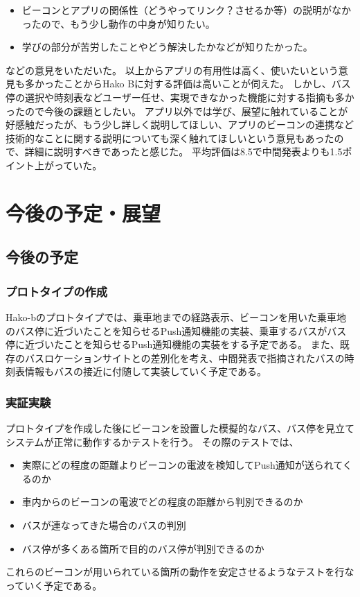 \documentclass[openany,11pt,papersize]{jsbook}
\begin{document}
\begin{description}
\begin{itemize}
\item ビーコンとアプリの関係性（どうやってリンク？させるか等）の説明がなかったので、もう少し動作の中身が知りたい。
\item 学びの部分が苦労したことやどう解決したかなどが知りたかった。

\end{itemize}
などの意見をいただいた。
以上からアプリの有用性は高く、使いたいという意見も多かったことからHako Bに対する評価は高いことが伺えた。
しかし、バス停の選択や時刻表などユーザー任せ、実現できなかった機能に対する指摘も多かったので今後の課題としたい。
アプリ以外では学び、展望に触れていることが好感触だったが、もう少し詳しく説明してほしい、アプリのビーコンの連携など技術的なことに関する説明についても深く触れてほしいという意見もあったので、詳細に説明すべきであったと感じた。
平均評価は8.5で中間発表よりも1.5ポイント上がっていた。

\end{description}

\chapter{今後の予定・展望}
\section{今後の予定}
\subsection{プロトタイプの作成}
Hako-bのプロトタイプでは、乗車地までの経路表示、ビーコンを用いた乗車地のバス停に近づいたことを知らせるPush通知機能の実装、乗車するバスがバス停に近づいたことを知らせるPush通知機能の実装をする予定である。
また、既存のバスロケーションサイトとの差別化を考え、中間発表で指摘されたバスの時刻表情報もバスの接近に付随して実装していく予定である。


\subsection{実証実験}
プロトタイプを作成した後にビーコンを設置した模擬的なバス、バス停を見立てシステムが正常に動作するかテストを行う。
その際のテストでは、
\begin{itemize}

\item 実際にどの程度の距離よりビーコンの電波を検知してPush通知が送られてくるのか
\item 車内からのビーコンの電波でどの程度の距離から判別できるのか
\item バスが連なってきた場合のバスの判別
\item バス停が多くある箇所で目的のバス停が判別できるのか

\end{itemize}
これらのビーコンが用いられている箇所の動作を安定させるようなテストを行なっていく予定である。
\end{document}

